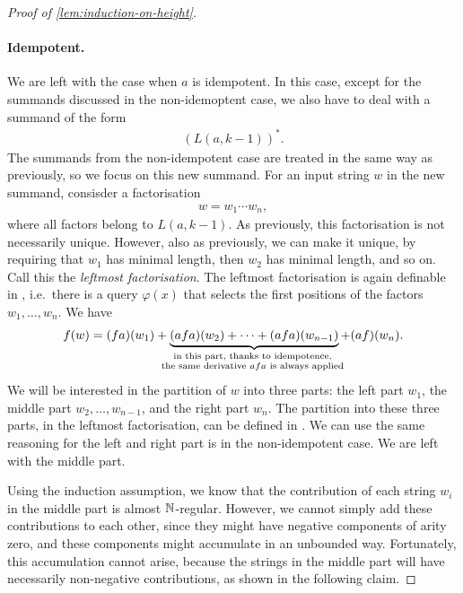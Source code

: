 \begin{proof}[Proof of \cref{lem:induction-on-height}]
\paragraph*{Idempotent.} We are left with the case when $a$ is idempotent. In this case, except for the summands discussed in the non-idemoptent case,  we also have to deal with a summand of the form 
\begin{align*}
(L(a,k-1))^*.
\end{align*}
The summands from the non-idempotent case are treated in the same way as previously, so we focus on this new summand.
For an input string $w$ in the new summand, consisder a factorisation 
\begin{align*}
w = w_1 \cdots w_n,
\end{align*}
where all factors belong to $L(a,k-1)$. As previously, this factorisation is not necessarily unique. However, also as previously,  we can make it unique, by requiring that $w_1$ has minimal length, then $w_2$ has minimal length, and so on. Call this the \emph{leftmost factorisation}. The leftmost factorisation is again definable  in \mso, i.e.~there is a query $\varphi(x)$ that selects the first positions of the factors $w_1,\ldots,w_n$.  We have 
\begin{align*}
f(w) = (fa)(w_1) + \myunderbrace{(afa)(w_2) +  \cdots + (afa)(w_{n-1})}{in this part, thanks to idempotence, \\ the same derivative $afa$ is always applied} + (a f)(w_n).
\end{align*}
We will be interested in the partition of $w$ into three parts: the left part $w_1$, the middle part $w_2,\ldots,w_{n-1}$, and the right part $w_n$. The partition into these three parts, in the leftmost factorisation,  can be defined in \mso.  We can use the same reasoning for the left and right part is in the non-idempotent case. We are left with the middle part. 

Using the induction assumption, we know that the contribution of each string $w_i$ in the middle part is almost ${\mathbb N}$-regular. However, we cannot simply add these contributions to each other, since they might have negative components of arity zero, and these components might accumulate in an unbounded way. Fortunately, this accumulation cannot arise, because the strings in the middle part will have necessarily non-negative contributions, as shown in the following claim. 




\end{proof}
